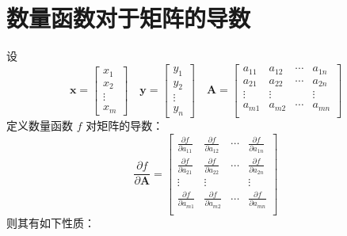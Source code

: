 \documentclass[UTF8,space=auto]{ctexart} %
\begin{document}
\section{数量函数对于矩阵的导数}
设
\[
\mathbf{x} =
\begin{bmatrix}
	x_1 \\ x_2 \\ \vdots \\ x_m
\end{bmatrix}\quad
\mathbf{y} =
\begin{bmatrix}
	y_1 \\ y_2 \\ \vdots \\ y_n
\end{bmatrix}\quad
\mathbf{A} =
\begin{bmatrix}
	a_{11} & a_{12} & \cdots & a_{1n} \\
	a_{21} & a_{22} & \cdots & a_{2n} \\
	\vdots & \vdots & & \vdots \\
	a_{m1} & a_{m2} & \cdots & a_{mn} \\
\end{bmatrix}
\]
定义数量函数 $ f $ 对矩阵的导数：
\[
\frac{\partial f}{\partial \mathbf{A}}
= \begin{bmatrix}
	\frac{\partial f}{\partial a_{11}} & \frac{\partial f}{\partial a_{12}} & \cdots & \frac{\partial f}{\partial a_{1n}} \\
	\frac{\partial f}{\partial a_{21}} & \frac{\partial f}{\partial a_{22}} & \cdots & \frac{\partial f}{\partial a_{2n}} \\
	\vdots & \vdots & & \vdots \\
	\frac{\partial f}{\partial a_{m1}} & \frac{\partial f}{\partial a_{m2}} & \cdots & \frac{\partial f}{\partial a_{mn}} \\
\end{bmatrix}
\]
则其有如下性质：
\end{document}
